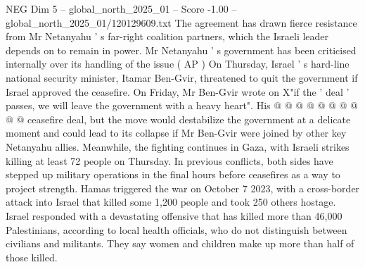 \begin{textsample}{NEG Dim 5 – global\_north\_2025\_01 – Score -1.00 – global\_north\_2025\_01/120129609.txt}
The agreement has drawn fierce resistance from Mr Netanyahu ' s far-right coalition partners, which the Israeli leader depends on to remain in power.
Mr Netanyahu ' s government has been criticised internally over its handling of the issue ( AP ) On Thursday, Israel ' s hard-line national security minister, Itamar Ben-Gvir, threatened to quit the government if Israel approved the ceasefire.
On Friday, Mr Ben-Gvir wrote on X"if the ' deal ' passes, we will leave the government with a heavy heart".
His @ @ @ @ @ @ @ @ @ @ ceasefire deal, but the move would destabilize the government at a delicate moment and could lead to its collapse if Mr Ben-Gvir were joined by other key Netanyahu allies.
Meanwhile, the fighting continues in Gaza, with Israeli strikes killing at least 72 people on Thursday.
In previous conflicts, both sides have stepped up military operations in the final hours before ceasefires as a way to project strength.
Hamas triggered the war on October 7 2023, with a cross-border attack into Israel that killed some 1,200 people and took 250 others hostage.
Israel responded with a devastating offensive that has killed more than 46,000 Palestinians, according to local health officials, who do not distinguish between civilians and militants.
They say women and children make up more than half of those killed.

\end{textsample}

